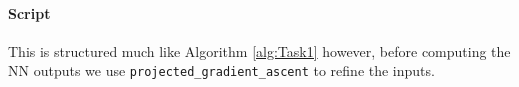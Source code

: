\documentclass[11pt]{article}
\begin{document}
\paragraph{Script}
This is structured much like Algorithm \ref{alg:Task1} however, before computing the NN outputs we use \texttt{projected\_gradient\_ascent} to refine the inputs. 
\end{document}
